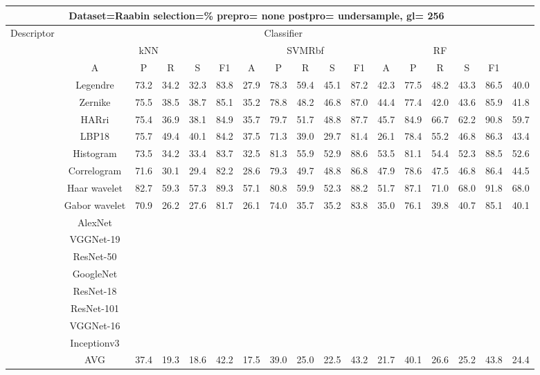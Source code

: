 \documentclass[12pt,italian]{article}
\begin{document}
\begin{tiny}
\begin{longtable}{lcccccccccccccccc}
\toprule
\multicolumn{16}{c}{Dataset=Raabin selection=\% prepro= none postpro= undersample, gl= 256} \\ 
\toprule
Descriptor & \multicolumn{15}{c}{Classifier} \\ 
& \multicolumn{5}{c}{kNN} & \multicolumn{5}{c}{SVMRbf} & \multicolumn{5}{c}{RF} \\ 
& A & P & R & S & F1 & A & P & R & S & F1 & A & P & R & S & F1 \\ 
\midrule
& Legendre & 73.2 & 34.2 & 32.3 & 83.8 & 27.9 & 78.3 & 59.4 & 45.1 & 87.2 & 42.3 & 77.5 & 48.2 & 43.3 & 86.5 & 40.0 \\ 
& Zernike & 75.5 & 38.5 & 38.7 & 85.1 & 35.2 & 78.8 & 48.2 & 46.8 & 87.0 & 44.4 & 77.4 & 42.0 & 43.6 & 85.9 & 41.8 \\ 
& HARri & 75.4 & 36.9 & 38.1 & 84.9 & 35.7 & 79.7 & 51.7 & 48.8 & 87.7 & 45.7 & 84.9 & 66.7 & 62.2 & 90.8 & 59.7 \\ 
& LBP18 & 75.7 & 49.4 & 40.1 & 84.2 & 37.5 & 71.3 & 39.0 & 29.7 & 81.4 & 26.1 & 78.4 & 55.2 & 46.8 & 86.3 & 43.4 \\ 
& Histogram & 73.5 & 34.2 & 33.4 & 83.7 & 32.5 & 81.3 & 55.9 & 52.9 & 88.6 & 53.5 & 81.1 & 54.4 & 52.3 & 88.5 & 52.6 \\ 
& Correlogram & 71.6 & 30.1 & 29.4 & 82.2 & 28.6 & 79.3 & 49.7 & 48.8 & 86.8 & 47.9 & 78.6 & 47.5 & 46.8 & 86.4 & 44.5 \\ 
& Haar wavelet & 82.7 & 59.3 & 57.3 & 89.3 & 57.1 & 80.8 & 59.9 & 52.3 & 88.2 & 51.7 & 87.1 & 71.0 & 68.0 & 91.8 & 68.0 \\ 
& Gabor wavelet & 70.9 & 26.2 & 27.6 & 81.7 & 26.1 & 74.0 & 35.7 & 35.2 & 83.8 & 35.0 & 76.1 & 39.8 & 40.7 & 85.1 & 40.1 \\ 
& AlexNet \\ 
& VGGNet-19 \\ 
& ResNet-50 \\ 
& GoogleNet \\ 
& ResNet-18 \\ 
& ResNet-101 \\ 
& VGGNet-16 \\ 
& Inceptionv3 \\ 
\hline
& AVG & 37.4 & 19.3 & 18.6 & 42.2 & 17.5 & 39.0 & 25.0 & 22.5 & 43.2 & 21.7 & 40.1 & 26.6 & 25.2 & 43.8 & 24.4 \\ 
\hline
\bottomrule
\end{longtable} 


\end{tiny}
\end{document}
